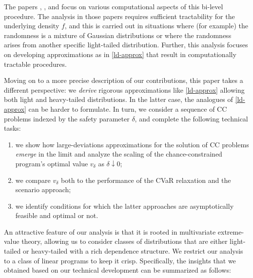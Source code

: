 \documentclass[a4paper, a4wide, 10pt, reqno]{amsart}
\theoremstyle{plain}
\begin{document}
The papers \cite{Subramanyam2020}, \cite{NNZ19}, and \cite{tong2020optimization} focus on various computational aspects of this bi-level procedure. The analysis in those papers requires sufficient tractability for the underlying density $f$, and this is carried out in situations where (for example) the randomness is a mixture of Gaussian distributions or where the randomness arises from another specific light-tailed distribution. Further, this analysis focuses on developing approximations as in \eqref{ld-approx} that result in computationally tractable procedures. 

Moving on to a more precise description of our contributions, this paper takes a different perspective:
we {\em derive} rigorous 
approximations like \eqref{ld-approx} 
allowing both light and heavy-tailed distributions. In the latter case, the analogues of \eqref{ld-approx} can be harder to formulate. In turn, we consider a sequence of CC problems indexed by the safety parameter $\delta$, and complete the following technical tasks: 
\begin{enumerate}[leftmargin=17pt]
    \item[(a)] we show how large-deviations approximations for the solution of CC problems {\em emerge} in the limit and analyze the scaling of the chance-constrained program's optimal value $v_\delta$  as $\delta\downarrow 0$; 
    \item[(b)]we compare $v_\delta$ both to the performance of the CVaR relaxation and the scenario approach;  
    \item[(c)]we identify conditions for which the latter approaches are asymptotically feasible and optimal or not. 
\end{enumerate}
An attractive feature of our analysis is that it is rooted in multivariate extreme-value theory, 
allowing us to consider classes of distributions that are either light-tailed or heavy-tailed with a rich dependence structure. We restrict our analysis to a class of linear programs to keep it crisp. Specifically, the insights that we obtained based on our technical development can be summarized as follows: 
\end{document}
